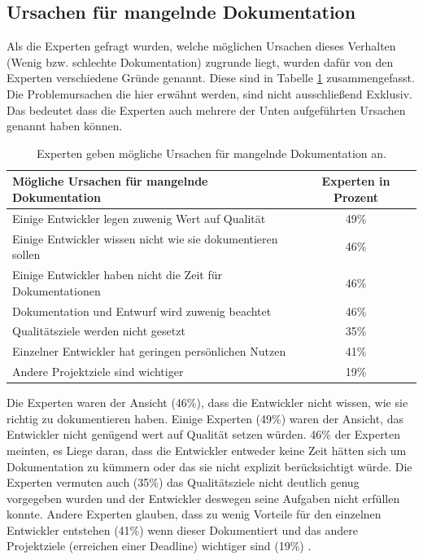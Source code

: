 \documentclass[a4paper,12pt]{scrartcl}
\begin{document}
\subsection{Ursachen für mangelnde Dokumentation}
Als die Experten gefragt wurden, welche möglichen Ursachen dieses Verhalten (Wenig bzw. schlechte Dokumentation) zugrunde liegt, wurden dafür von den Experten verschiedene Gründe genannt. Diese sind in Tabelle \ref{UrsachenTabelle} zusammengefasst. Die Problemursachen die hier erwähnt werden, sind nicht ausschließend Exklusiv. Das bedeutet dass die Experten auch mehrere der Unten aufgeführten Ursachen genannt haben können.
\begin{table}[htb]
\begin{tabular}{|l|c|}\hline
\rule{0pt}{15pt}\textbf{Mögliche Ursachen für mangelnde Dokumentation}  & \textbf{Experten in Prozent}
\\
\hline
\rule{0pt}{15pt} Einige Entwickler legen zuwenig Wert auf Qualität & 49\% \\ 
\hline
\rule{0pt}{15pt} Einige Entwickler wissen nicht wie sie dokumentieren sollen & 46\%\\
\hline
\rule{0pt}{15pt} Einige Entwickler haben nicht die Zeit für Dokumentationen & 46\%\\
\hline
\rule{0pt}{15pt} Dokumentation und Entwurf wird zuwenig beachtet & 46\%\\
\hline
\rule{0pt}{15pt} Qualitätsziele werden nicht gesetzt & 35\%\\
\hline
\rule{0pt}{15pt} Einzelner Entwickler hat geringen persönlichen Nutzen & 41\%\\
\hline
\rule{0pt}{15pt} Andere Projektziele sind wichtiger & 19\%\\
\hline
\end{tabular}
\caption{Experten geben mögliche Ursachen für mangelnde Dokumentation an.}
\label{UrsachenTabelle}
\end{table}
Die Experten waren der Ansicht (46\%), dass die Entwickler nicht wissen, wie sie richtig zu dokumentieren haben. Einige Experten (49\%) waren der Ansicht, das Entwickler nicht genügend wert auf Qualität setzen würden. 46\% der Experten meinten, es Liege daran, dass die Entwickler entweder keine Zeit hätten sich um Dokumentation zu kümmern oder das sie nicht explizit berücksichtigt würde. Die Experten vermuten auch (35\%) das Qualitätsziele nicht deutlich genug vorgegeben wurden und der Entwickler deswegen seine Aufgaben nicht erfüllen konnte. Andere Experten glauben, dass zu wenig Vorteile für den einzelnen Entwickler entstehen (41\%) wenn dieser Dokumentiert und das andere Projektziele (erreichen einer Deadline) wichtiger sind (19\%) \cite{Prause2012}.
\end{document}
